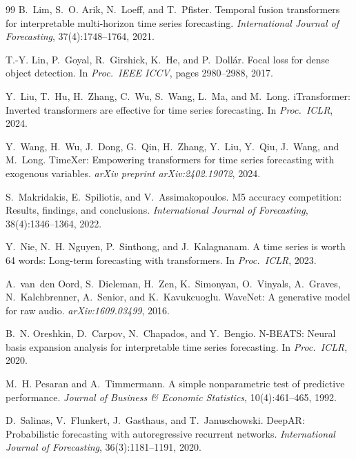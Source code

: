 \documentclass[11pt]{article}
\begin{document}
\begin{thebibliography}{99}
B.~Lim, S.~O. Arik, N.~Loeff, and T.~Pfister.
Temporal fusion transformers for interpretable multi-horizon time series
forecasting.
\emph{International Journal of Forecasting}, 37(4):1748--1764, 2021.

T.-Y. Lin, P.~Goyal, R.~Girshick, K.~He, and P.~Doll{\'a}r.
Focal loss for dense object detection.
In \emph{Proc.\ IEEE ICCV}, pages 2980--2988, 2017.

Y.~Liu, T.~Hu, H.~Zhang, C.~Wu, S.~Wang, L.~Ma, and M.~Long.
iTransformer: Inverted transformers are effective for time series forecasting.
In \emph{Proc.\ ICLR}, 2024.

Y.~Wang, H.~Wu, J.~Dong, G.~Qin, H.~Zhang, Y.~Liu, Y.~Qiu, J.~Wang,
and M.~Long.
TimeXer: Empowering transformers for time series forecasting with exogenous
variables.
\emph{arXiv preprint arXiv:2402.19072}, 2024.

S.~Makridakis, E.~Spiliotis, and V.~Assimakopoulos.
M5 accuracy competition: Results, findings, and conclusions.
\emph{International Journal of Forecasting}, 38(4):1346--1364, 2022.

Y.~Nie, N.~H. Nguyen, P.~Sinthong, and J.~Kalagnanam.
A time series is worth 64 words: Long-term forecasting with transformers.
In \emph{Proc.\ ICLR}, 2023.

A.~van~den Oord, S.~Dieleman, H.~Zen, K.~Simonyan, O.~Vinyals, A.~Graves,
N.~Kalchbrenner, A.~Senior, and K.~Kavukcuoglu.
WaveNet: A generative model for raw audio.
\emph{arXiv:1609.03499}, 2016.

B.~N. Oreshkin, D.~Carpov, N.~Chapados, and Y.~Bengio.
N-BEATS: Neural basis expansion analysis for interpretable time series
forecasting.
In \emph{Proc.\ ICLR}, 2020.

M.~H. Pesaran and A.~Timmermann.
A simple nonparametric test of predictive performance.
\emph{Journal of Business \& Economic Statistics}, 10(4):461--465, 1992.

D.~Salinas, V.~Flunkert, J.~Gasthaus, and T.~Januschowski.
DeepAR: Probabilistic forecasting with autoregressive recurrent networks.
\emph{International Journal of Forecasting}, 36(3):1181--1191, 2020.


\end{thebibliography}
\end{document}
